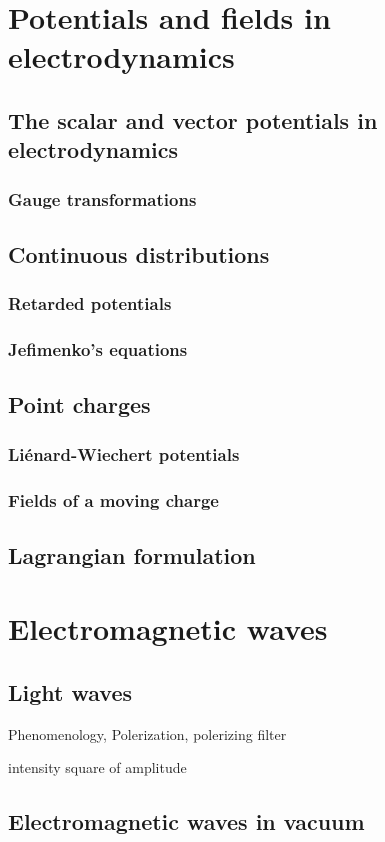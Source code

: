 \chapter{Potentials and fields in electrodynamics}
\section{The scalar and vector potentials in electrodynamics}
\subsection{Gauge transformations}
\section{Continuous distributions}
\subsection{Retarded potentials}
\subsection{Jefimenko's equations}
\section{Point charges}
\subsection{Liénard-Wiechert potentials}
\subsection{Fields of a moving charge}
\section{Lagrangian formulation}

\chapter{Electromagnetic waves}
\section{Light waves}
Phenomenology, Polerization, polerizing filter

intensity square of amplitude
\section{Electromagnetic waves in vacuum}
